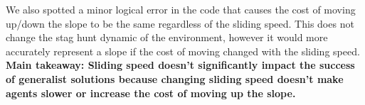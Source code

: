 \documentclass[12pt]{article}
\begin{document}
\begin{appendices}
We also spotted a minor logical error in the code that causes the cost of moving up/down the slope to be the same regardless of the sliding speed. This does not change the stag hunt dynamic of the environment, however it would more accurately represent a slope if the cost of moving changed with the sliding speed.\\ 

\textbf{Main takeaway: Sliding speed doesn't significantly impact the success of generalist solutions because changing sliding speed doesn't make agents slower or increase the cost of moving up the slope.}

\begin{figure}[!tbp]
  \centering
  \hfill
  \hfill
  

\end{figure}
\end{appendices}
\end{document}
